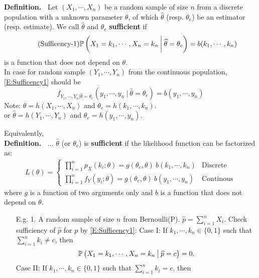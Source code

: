  \begin{frame}

{\bf Definition.~} Let $(X_1,\cdots, X_n)$ be a random sample of size $n$ from a discrete population with a unknown parameter $\theta$, of which $\widehat{\theta}$ (resp. $\theta_e$) be an estimator (resp. estimate).
We call $\widehat\theta$ and $\theta_e$ {\bf sufficient} if
\begin{align}\label{E:Sufficency1}
\tag{Sufficency-1}
\mathbb{P}\left(X_1=k_1,\cdots, X_n=k_n \: \bigg| \: \widehat\theta = \theta_e\right) = b(k_1,\cdots,k_n)
\end{align}
is a function that does not depend on $\theta$. \\[1em]
In case for random sample $(Y_1,\cdots,Y_n)$ from the continuous population, \eqref{E:Sufficency1} should be
\[
f_{Y_1,\cdots,Y_n |\widehat\theta =\theta_e}\left(y_1,\cdots, y_n \: \bigg| \: \widehat\theta = \theta_e\right) = b(y_1,\cdots,y_n)
\]
\vfill
Note: $\widehat\theta = h(X_1,\cdots, X_n)$ and $\theta_e=h(k_1,\cdots,k_n)$.\\
\qquad or $\widehat\theta = h(Y_1,\cdots, Y_n)$ and $\theta_e=h(y_1,\cdots,y_n)$.
\end{frame}
\begin{frame}
Equivalently, \\[1em]

{\bf Definition.~}  ... $\widehat\theta$ (or $\theta_e$) is {\bf sufficient} if the likelihood function can be factorized as:
\begin{align}\label{E:Sufficency2}
\tag{Sufficency-2}
L(\theta) =
\begin{cases}
 \displaystyle \prod_{i=1}^n p_X(k_i;\theta) =g(\theta_e,\theta) \: b(k_1,\cdots,k_n) & \text{Discrete}\\[1em]
 \displaystyle \prod_{i=1}^n f_Y(y_i;\theta)=g(\theta_e,\theta) \: b(y_1,\cdots,y_n)& \text{Continous}
\end{cases}
\end{align}
where $g$ is a function of two arguments only and $b$ is a function that does not depend on $\theta$.

\end{frame}
\begin{frame}
\begin{enumerate}
 \item[E.g. 1.] A random sample of size $n$ from Bernoulli(P). $\widehat p = \sum_{i=1}^n X_i$. Check sufficiency of $\widehat p$ for $p$ by \eqref{E:Sufficency1}:
 \vfill \pause
 Case I: If $k_1,\cdots,k_n\in\{0,1\}$ such that $\sum_{i=1}^n k_i\ne c$, then
 \[
 \mathbb{P}\left(X_1=k_1,\cdots,X_n=k_n \:\big| \: \widehat p = c \right) = 0.
 \]\pause
 \vfill
 Case II: If $k_1,\cdots,k_n\in\{0,1\}$ such that $\sum_{i=1}^n k_i=c$, then
\end{enumerate}
\end{frame}
